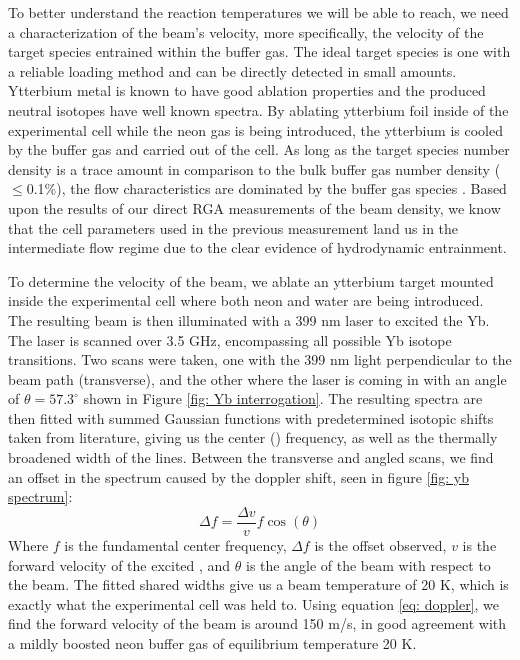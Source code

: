 To better understand the reaction temperatures we will be able to reach, we need a characterization of the beam's velocity, more specifically, the velocity of the target species entrained within the buffer gas. The ideal target species is one with a reliable loading method and can be directly detected in small amounts. Ytterbium metal is known to have good ablation properties and the produced neutral isotopes have well known spectra. By ablating ytterbium foil inside of the experimental cell while the neon gas is being introduced, the ytterbium is cooled by the buffer gas and carried out of the cell. As long as the target species number density is a trace amount in comparison to the bulk buffer gas number density ($\leq$0.1\%), the flow characteristics are dominated by the buffer gas species \cite{Hutzler2012}. Based upon the results of our direct RGA measurements of the beam density, we know that the cell parameters used in the previous measurement land us in the intermediate flow regime due to the clear evidence of hydrodynamic entrainment.

To determine the velocity of the beam, we ablate an ytterbium target mounted inside the experimental cell where both neon and water are being introduced. The resulting beam is then illuminated with a 399 nm laser to excited the Yb. The laser is scanned over 3.5 GHz, encompassing all possible Yb isotope transitions. Two scans were taken, one with the 399 nm light perpendicular to the beam path (transverse), and the other where the laser is coming in with an angle of $\theta=57.3^\circ$ shown in Figure \ref{fig: Yb interrogation}. The resulting spectra are then fitted with summed Gaussian functions with predetermined isotopic shifts taken from literature, giving us the center () frequency, as well as the thermally broadened width of the lines. Between the transverse and angled scans, we find an offset in the spectrum caused by the doppler shift, seen in figure \ref{fig: yb spectrum}:
\begin{equation}
	\Delta f = \frac{\Delta v}{v} f \cos(\theta)
	\label{eq: doppler}
\end{equation}
Where $f$ is the fundamental center frequency, $\Delta f$ is the offset observed, $v$ is the forward velocity of the excited , and $\theta$ is the angle of the beam with respect to the beam. The fitted shared widths give us a beam temperature of 20 K, which is exactly what the experimental cell was held to. Using equation \ref{eq: doppler}, we find the forward velocity of the beam is around 150 m/s, in good agreement with a mildly boosted neon buffer gas of equilibrium temperature 20 K. 

